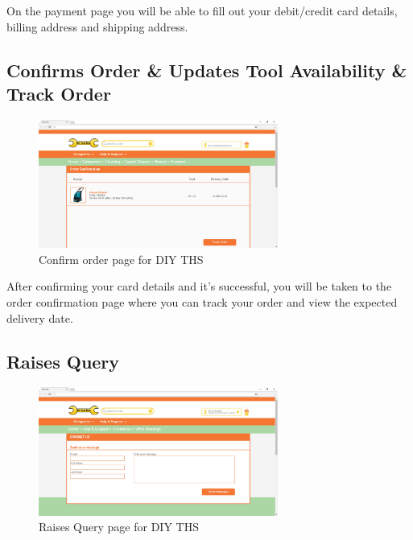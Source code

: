 On the payment page you will be able to fill out your debit/credit card
details, billing address and shipping address.

\hypertarget{confirms-order-updates-tool-availability-track-order}{%
\subsection{Confirms Order \& Updates Tool Availability \& Track
Order}\label{confirms-order-updates-tool-availability-track-order}}

\begin{figure}[H]
      \centering
      \includegraphics[trim = 0 0 0 0, clip, width=0.7\textwidth]{TempImg/confirm.png}
      \caption{Confirm order page for DIY THS}
 \end{figure}

After confirming your card details and it's successful, you will be
taken to the order confirmation page where you can track your order and
view the expected delivery date.

\hypertarget{raises-query}{%
\subsection{Raises Query}\label{raises-query}}

\begin{figure}[H]
      \centering
      \includegraphics[trim = 0 0 0 0, clip, width=0.7\textwidth]{TempImg/query.png}
      \caption{Raises Query page for DIY THS}
 \end{figure}

